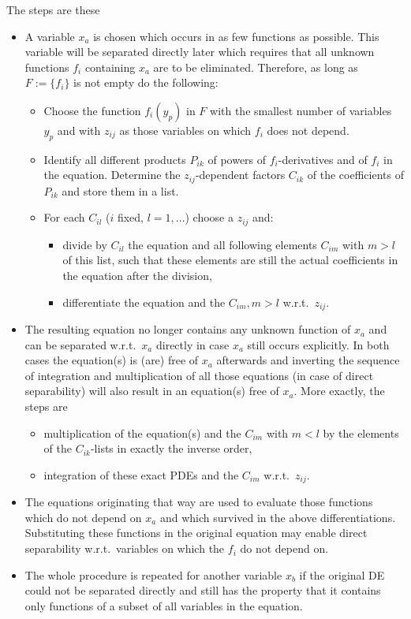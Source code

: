 The steps are these
\begin{itemize}
\item A variable $x_a$ is chosen which occurs in as few functions as
  possible.  This variable will be separated directly later which
  requires that all unknown functions $f_i$ containing $x_a$ are to be
  eliminated.  Therefore, as long as $F:=\{f_i\}$ is not empty do the
  following:
  \begin{itemize}
  \item Choose the function $f_i(y_p)$ in $F$ with the smallest number
    of variables $y_p$ and with $z_{ij}$ as those variables on which
    $f_i$ does not depend.
  \item Identify all different products $P_{ik}$ of powers of
    $f_i$-derivatives and of $f_i$ in the equation.  Determine the
    $z_{ij}$-dependent factors $C_{ik}$ of the coefficients of
    $P_{ik}$ and store them in a list.
  \item For each $C_{il}$ ($i$ fixed, $l=1,\ldots$) choose a $z_{ij}$
    and:
    \begin{itemize}
    \item divide by $C_{il}$ the equation and all following elements
      $C_{im}$ with $m>l$ of this list, such that these elements are
      still the actual coefficients in the equation after the
      division,
    \item differentiate the equation and the $C_{im}, m>l$
      w.r.t.\ $z_{ij}$.
    \end{itemize}
  \end{itemize}
\item The resulting equation no longer contains any unknown function
  of $x_a$ and can be separated w.r.t.\ $x_a$ directly in case $x_a$
  still occurs explicitly.  In both cases the equation(s) is (are)
  free of $x_a$ afterwards and inverting the sequence of integration
  and multiplication of all those equations (in case of direct
  separability) will also result in an equation(s) free of $x_a$.
  More exactly, the steps are
  \begin{itemize}
  \item multiplication of the equation(s) and the $C_{im}$ with $m<l$
    by the elements of the $C_{ik}$-lists in exactly the inverse
    order,
  \item integration of these exact PDEs and the $C_{im}$
    w.r.t.\ $z_{ij}$.
  \end{itemize}
\item The equations originating that way are used to evaluate those
  functions which do not depend on $x_a$ and which survived in the
  above differentiations.  Substituting these functions in the
  original equation may enable direct separability w.r.t.\ variables
  on which the $f_i$ do not depend on.
\item The whole procedure is repeated for another variable $x_b$ if
  the original DE could not be separated directly and still has the
  property that it contains only functions of a subset of all
  variables in the equation.
\end{itemize}
